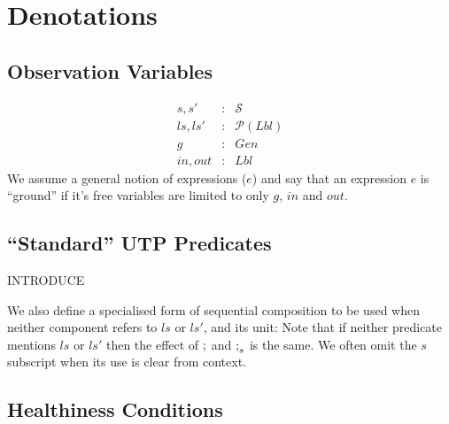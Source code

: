 \section{Denotations}\label{sec:denote}


\subsection{Observation Variables}

\begin{eqnarray*}
   s, s' &:& \mathcal S
\\ ls, ls' &:& \mathcal P (Lbl)
\\ g &:& Gen
\\ in, out &:& Lbl
\end{eqnarray*}
We assume a general notion of expressions ($e$)
and say that an expression $e$ is ``ground''
if it's free variables are limited to only $g$, $in$ and $out$.




\subsection{``Standard'' UTP Predicates}

INTRODUCE

We also define a specialised form of sequential composition
to be used when neither component refers to $ls$ or $ls'$,
and its unit:
Note that if neither predicate mentions $ls$ or $ls'$
then the effect of $\mathrel{;}$ and $\mathrel{;}_s$ is the same.
We often omit the $s$ subscript when its use is clear from context.

\subsection{Healthiness Conditions}

